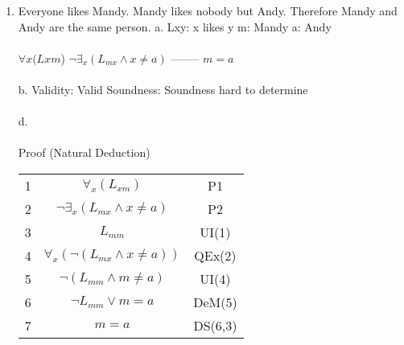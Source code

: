 \documentclass[]{article}
\begin{document}
\begin{enumerate}
    \item Everyone likes Mandy. Mandy likes nobody but Andy. Therefore Mandy and Andy are the same person.
    \newline a.
    \newline Lxy: x likes y
    \newline m: Mandy
    \newline a: Andy
    \\\\ $\forall x (Lxm$)
    \newline $\neg \exists_x(L_{mx} \land x\neq a)$
    \newline --------
    \newline $m=a$
    \\\\b.
    \newline Validity: Valid
    \newline Soundness: Soundness hard to determine
    \\\\d.
    \\\\ Proof (Natural Deduction)
    \begin{tabular}{c| c | c}
        1 & $\forall_x (L_{xm})$ & P1 \\
        2 & $\neg \exists_x (L_{mx} \land x \neq a)$ & P2 \\
        3 & $L_{mm}$ & UI(1) \\
        4 & $\forall_x(\neg(L_{mx} \land x \neq a))$ & QEx(2) \\
        5 & $\neg(L_{mm} \land m \neq a)$ & UI(4) \\
        6 & $\neg L_{mm} \lor m=a$ & DeM(5) \\
        7 & $m=a$ & DS(6,3) \\
    \end{tabular}
    

\end{enumerate}
\end{document}
